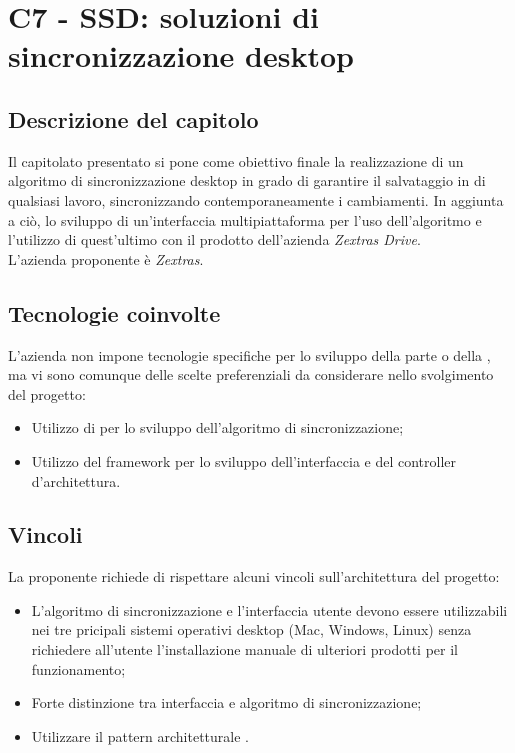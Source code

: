 \section{C7 - SSD: soluzioni di sincronizzazione desktop}

\subsection{Descrizione del capitolo}
Il capitolato presentato si pone come obiettivo finale la realizzazione di un algoritmo di sincronizzazione desktop in grado di garantire il salvataggio in  di qualsiasi lavoro, sincronizzando contemporaneamente i cambiamenti. In aggiunta a ciò, lo sviluppo di un'interfaccia multipiattaforma per l'uso dell'algoritmo e l'utilizzo di quest'ultimo con il prodotto dell'azienda \textit{Zextras Drive}.\\
L'azienda proponente è \textit{Zextras}.

\subsection{Tecnologie coinvolte}
L'azienda non impone tecnologie specifiche per lo sviluppo della parte  o della , ma vi sono comunque delle scelte preferenziali da considerare nello svolgimento del progetto:
\begin{itemize}
\item Utilizzo di  per lo sviluppo dell'algoritmo di sincronizzazione;
\item Utilizzo del framework  per lo sviluppo dell'interfaccia e del controller d'architettura.
\end{itemize}

\subsection{Vincoli}
La proponente richiede di rispettare alcuni vincoli sull'architettura del progetto: 
\begin{itemize}
\item L’algoritmo di sincronizzazione e l’interfaccia utente devono essere utilizzabili nei tre pricipali sistemi operativi desktop (Mac, Windows, Linux) senza richiedere all’utente l’installazione manuale di ulteriori prodotti per il funzionamento; 
\item Forte distinzione tra interfaccia e algoritmo di sincronizzazione; 
\item Utilizzare il pattern architetturale .
\end{itemize}

